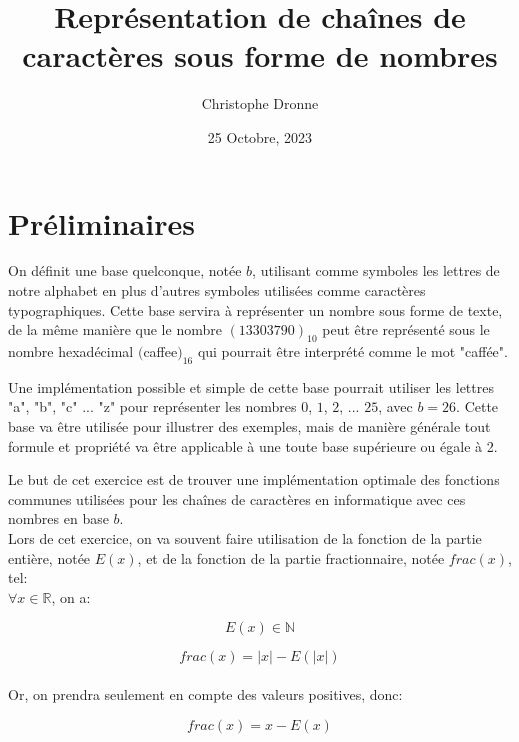 \documentclass[a4paper, 12pt]{article}
\title{\vspace{-4cm}Représentation de chaînes de caractères sous forme de nombres}
\author{Christophe Dronne}
\date{25 Octobre, 2023}
\begin{document}
\maketitle

\section*{Préliminaires}
On définit une base quelconque, notée $b$, utilisant comme symboles les lettres de notre alphabet en plus d'autres symboles utilisées comme caractères typographiques. Cette base servira à représenter un nombre sous forme de texte, de la même manière que le nombre $(13303790)_{10}$ peut être représenté sous le nombre hexadécimal $($caffee$)_{16}$ qui pourrait être interprété comme le mot "caffée".

Une implémentation possible et simple de cette base pourrait utiliser les lettres "a", "b", "c" ... "z" pour représenter les nombres $0$, $1$, $2$, ... $25$, avec $b = 26$. Cette base va être utilisée pour illustrer des exemples, mais de manière générale tout formule et propriété va être applicable à une toute base supérieure ou égale à 2.

Le but de cet exercice est de trouver une implémentation optimale des fonctions communes utilisées pour les chaînes de caractères en informatique avec ces nombres en base $b$. \\

\noindent Lors de cet exercice, on va souvent faire utilisation de la fonction de la partie entière, notée $E(x)$, et de la fonction de la partie fractionnaire, notée
$frac(x)$, tel: \\

$\forall x \in \mathbb{R}$, on a:

\begin{equation}
E \left( x \right) \in \mathbb{N}
\end{equation}

\begin{equation}
frac \left( x \right) = | x | - E \left( | x | \right)
\end{equation} \\

Or, on prendra seulement en compte des valeurs positives, donc:

\begin{equation}
frac \left( x \right) = x - E \left( x \right)
\end{equation}

\newpage
\end{document}
